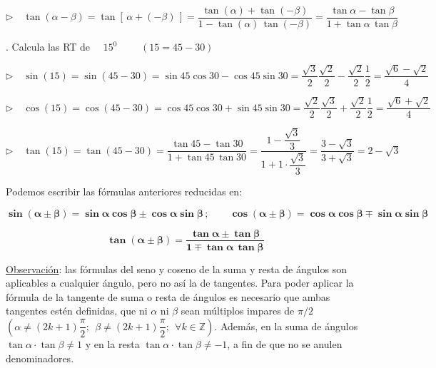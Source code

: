 \vspace{4mm} $\triangleright \quad \tan(\alpha-\beta)=\tan [\, \alpha+(-\beta) \, ]= \dfrac{\tan(\alpha)+\tan(-\beta)}{1-\tan (\alpha) \, \tan(-\beta)}= \dfrac {\tan \alpha - \tan \beta}{1+\tan \alpha \, \tan \beta}$\QED

\vspace{5mm} \begin{miejemplo}
 . Calcula las RT de $\quad 15^0$ \textcolor{gris}{$\qquad (15=45-30)$}	

 \vspace{4mm} $\triangleright \quad \sin(15)=\sin(45-30)=\sin 45 \cos 30 - \cos 45 \sin 30= \dfrac{\sqrt{3}}{2} \dfrac{\sqrt{2}}{2}-\dfrac{\sqrt{2}}{2} \dfrac 1 2  = \dfrac{\sqrt{6}-\sqrt{2}}{4}$
 
 \vspace{4mm} $\triangleright \quad \cos(15)=\cos(45-30)=\cos 45 \cos 30 + \sin 45 \sin 30 = \dfrac{\sqrt{2}}{2} \dfrac{\sqrt{3}}{2} + \dfrac{\sqrt{2}}{2} \dfrac 1 2= \dfrac{\sqrt{6}+\sqrt{2}}{4}$
 
 \vspace{4mm} $\triangleright \quad \tan(15)=\tan(45-30)=\dfrac{\tan 45 - \tan 30}{1+\tan 45 \, \tan 30}= \dfrac{1- \dfrac{\sqrt{3}}{3} }{1+1\cdot \dfrac{\sqrt{3}}{3}}=\dfrac{3-\sqrt{3}}{3+\sqrt{3}}=2-\sqrt{3}$
 \end{miejemplo}

\vspace{5mm}Podemos escribir las fórmulas anteriores reducidas en:

\vspace{4mm}
\begin{adjustwidth}{10pt}{10pt}
\begin{destacado}
\vspace{-5mm} $$\boldsymbol{ \sin(\alpha\pm\beta)  =  \sin \alpha  \cos \beta  \pm \cos \alpha \sin \beta }\, ; \qquad \boldsymbol{ \cos(\alpha \pm \beta)  =  \cos \alpha  \cos \beta   \mp  \sin \alpha  \sin \beta }$$

\vspace{-5mm} $$\boldsymbol{ 
\tan (\alpha \pm \beta)  =  \dfrac {\tan \alpha \pm \tan \beta}{1 \mp \tan \alpha \, \tan \beta} }$$
\end{destacado}
\end{adjustwidth}

\vspace{3mm} \underline{Observación}: las fórmulas del seno y coseno de la suma y resta de ángulos  son aplicables a cualquier ángulo, pero no así la de tangentes. 
Para poder aplicar la fórmula de la tangente de suma o resta de ángulos es necesario que ambas tangentes estén definidas, que ni $\alpha$ ni $\beta$ sean múltiplos impares de $\pi/2$ \textcolor{gris}{$\left( \alpha \neq (2k+1)\dfrac \pi 2;\ \ \beta \neq (2k+1)\dfrac \pi 2;\ \ \forall k 	\in \mathbb Z \right)$}. Además, en la suma de ángulos $\tan \alpha \cdot \tan \beta \neq 1$ y en la resta $\tan \alpha \cdot \tan \beta \neq -1$, a fin de que no se anulen denominadores.

